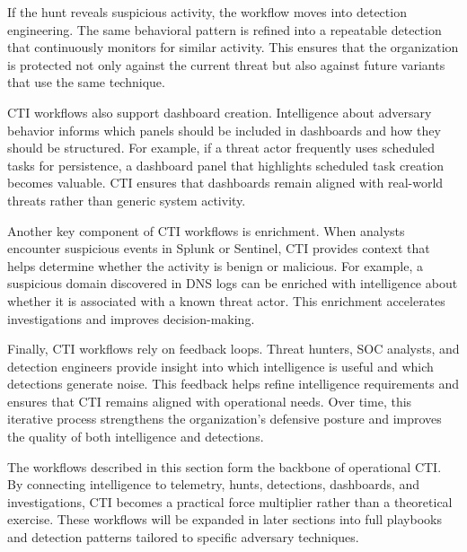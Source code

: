 If the hunt reveals suspicious activity, the workflow moves into detection engineering. The same behavioral pattern is refined into a repeatable detection that continuously monitors for similar activity. This ensures that the organization is protected not only against the current threat but also against future variants that use the same technique.

CTI workflows also support dashboard creation. Intelligence about adversary behavior informs which panels should be included in dashboards and how they should be structured. For example, if a threat actor frequently uses scheduled tasks for persistence, a dashboard panel that highlights scheduled task creation becomes valuable. CTI ensures that dashboards remain aligned with real-world threats rather than generic system activity.

Another key component of CTI workflows is enrichment. When analysts encounter suspicious events in Splunk or Sentinel, CTI provides context that helps determine whether the activity is benign or malicious. For example, a suspicious domain discovered in DNS logs can be enriched with intelligence about whether it is associated with a known threat actor. This enrichment accelerates investigations and improves decision-making.

Finally, CTI workflows rely on feedback loops. Threat hunters, SOC analysts, and detection engineers provide insight into which intelligence is useful and which detections generate noise. This feedback helps refine intelligence requirements and ensures that CTI remains aligned with operational needs. Over time, this iterative process strengthens the organization’s defensive posture and improves the quality of both intelligence and detections.

The workflows described in this section form the backbone of operational CTI. By connecting intelligence to telemetry, hunts, detections, dashboards, and investigations, CTI becomes a practical force multiplier rather than a theoretical exercise. These workflows will be expanded in later sections into full playbooks and detection patterns tailored to specific adversary techniques.
